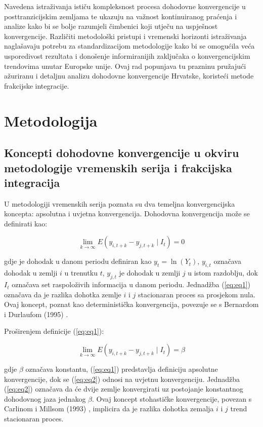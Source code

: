 \documentclass{crebsshr}
\begin{document}
    Navedena istraživanja ističu kompleksnost procesa dohodovne konvergencije u posttranzicijskim zemljama te ukazuju na važnost kontinuiranog praćenja i analize kako bi se bolje razumjeli čimbenici koji utječu na uspješnost konvergencije. Različiti metodološki pristupi i vremenski horizonti istraživanja naglašavaju potrebu za standardizacijom metodologije kako bi se omogućila veća usporedivost rezultata i donošenje informiranijih zaključaka o konvergencijskim trendovima unutar Europske unije. Ovaj rad popunjava tu prazninu pružajući ažuriranu i detaljnu analizu dohodovne konvergencije Hrvatske, koristeći metode frakcijske integracije.

\section{Metodologija}
    
    \subsection{Koncepti dohodovne konvergencije u okviru metodologije vremenskih serija i frakcijska integracija}
    
    U metodologiji vremenskih serija poznata su dva temeljna konvergencijska koncepta: apsolutna i uvjetna konvergencija. Dohodovna konvergencija može se definirati kao:
    
    \begin{equation} \label{eq:eq1}
    \lim_{k \to \infty} E(y_{i,t+k} - y_{j,t+k} \mid I_t) = 0
    \end{equation}
    
    gdje je dohodak u danom periodu definiran kao \( y_t = \ln(Y_t) \), \( y_{i,t} \) označava dohodak u zemlji \( i \) u trenutku \( t \), \( y_{j,t} \) je dohodak u zemlji \( j \) u istom razdoblju, dok \( I_t \) označava set raspoloživih informacija u danom periodu. Jednadžba (\ref{eq:eq1}) označava da je razlika dohotka zemlje \( i \) i \( j \) stacionaran proces sa prosjekom nula. Ovaj koncept, poznat kao deterministička konvergencija, povezuje se s Bernardom i Durlaufom (1995) \citep{Bernard1995}.
    
    Proširenjem definicije (\ref{eq:eq1}):
    
    \begin{equation} \label{eq:eq2}
    \lim_{k \to \infty} E(y_{i,t+k} - y_{j,t+k} \mid I_t) = \beta
    \end{equation}
    
    gdje \( \beta \) označava konstantu, (\ref{eq:eq1}) predstavlja definiciju apsolutne konvergencije, dok se (\ref{eq:eq2}) odnosi na uvjetnu konvergenciju. Jednadžba (\ref{eq:eq2}) označava da će dvije zemlje konvergirati uz postojanje konstantnog dohodovnog jaza jednakog \( \beta \). Ovaj koncept stohastičke konvergencije, povezan s Carlinom i Millsom (1993) \citep{Carlin1993}, implicira da je razlika dohotka zemalja \( i \) i \( j \) trend stacionaran proces.
    
\end{document}
